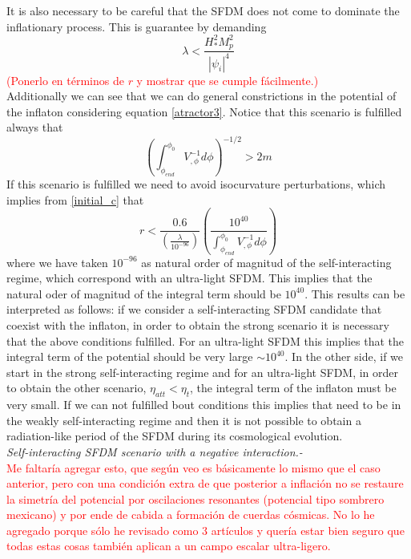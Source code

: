 \documentclass[twocolumn,           %
               showpacs,            %
               preprintnumbers,     %
               aps,                 %
               prl,          	    %
               letterpaper,             %
               superscriptaddress,      %
               nofootinbib,         %
               tightenlines,        %
               floats,floatfix      %
               ,usenatbib,
               ]{revtex4-1}
\begin{document}
It is also necessary to be careful that the SFDM does not come to dominate the inflationary process.  This is guarantee by demanding
\begin{equation}
\lambda < \frac{H_*^2 M_p^2}{|\psi_i|^4}
\end{equation}
\textcolor{red}{(Ponerlo en t\'erminos de $r$ y mostrar que se cumple f\'acilmente.)}
\\

Additionally we can see that we can do general constrictions in the potential of the inflaton considering equation \eqref{atractor3}. Notice that this scenario is fulfilled always that
\begin{equation}
\left(\int_{\phi_{end}}^{\phi_0}V_{,\phi}^{-1}d\phi\right)^{-1/2}>2m
\end{equation}
If this scenario is fulfilled we need to avoid isocurvature perturbations, which implies from \eqref{initial_c} that
\begin{equation}
r<\frac{0.6}{\left(\frac{\lambda}{10^{-96}}\right)}\left(\frac{10^{40}}{\int_{\phi_{end}}^{\phi_0}V_{,\phi}^{-1}d\phi}\right)
\end{equation}
where we have taken $10^{-96}$ as natural order of magnitud of the self-interacting regime, which correspond with an ultra-light SFDM. This implies that the natural oder of magnitud of the integral term should be $10^40$. This results can be interpreted as follows: if we consider a self-interacting SFDM candidate that coexist with the inflaton, in order to obtain the strong scenario it is necessary that the above conditions fulfilled. For an ultra-light SFDM this implies that the integral term of the potential should be very large $\sim 10^{40}$. In the other side, if we start in the strong self-interacting regime and for an ultra-light SFDM, in order to obtain the other scenario, $\eta_{att}<\eta_t$, the integral term of the inflaton must be very small. If we can not fulfilled bout conditions this implies that need to be in the weakly self-interacting regime and then it is not possible to obtain a radiation-like period of the SFDM during its cosmological evolution.
\\

\textit{Self-interacting SFDM scenario with a negative interaction.-}
\\
\textcolor{red}{Me faltar\'ia agregar esto, que seg\'un veo es b\'asicamente lo mismo que el caso anterior, pero con una condici\'on extra de que posterior a inflaci\'on no se restaure la simetr\'ia del potencial por oscilaciones resonantes (potencial tipo sombrero mexicano) y por ende de cabida a formaci\'on de cuerdas c\'osmicas. No lo he agregado porque s\'olo he revisado como 3 art\'iculos y quer\'ia estar bien seguro que todas estas cosas tambi\'en aplican a un campo escalar ultra-ligero.}
\end{document}
